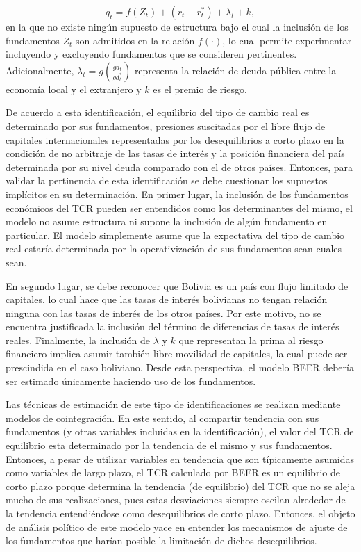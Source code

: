 \documentclass[12pt,letterpaper]{article}
\begin{document}
\begin{equation}\label{qb}
q_t=f(Z_t)+(r_t-r_t^*)+\lambda_t+k,
\end{equation}
en la que no existe ningún supuesto de estructura bajo el cual la inclusión de los fundamentos $Z_t$ son admitidos en la relación $f(\cdot)$, lo cual permite experimentar incluyendo y excluyendo fundamentos que se consideren pertinentes. Adicionalmente, $\lambda_t=g(\frac{gd_t}{gd_t^*})$ representa la relación de deuda pública entre la economía local y el extranjero y $k$ es el premio de riesgo. 

De acuerdo a esta identificación, el equilibrio del tipo de cambio real es determinado por sus fundamentos, presiones suscitadas por el libre flujo de capitales internacionales representadas por los desequilibrios a corto plazo en la condición de no arbitraje de las tasas de interés y la posición financiera del país determinada por su nivel deuda comparado con el de otros países. Entonces, para validar la pertinencia de esta identificación se debe cuestionar los supuestos implícitos en su determinación. En primer lugar, la inclusión de los fundamentos económicos del TCR pueden ser entendidos como los determinantes del mismo, el modelo no asume estructura ni supone la inclusión de algún fundamento en particular. El modelo simplemente asume que la expectativa del tipo de cambio real estaría determinada por la operativización de sus fundamentos sean cuales sean. 

En segundo lugar, se debe reconocer que Bolivia es un país con flujo limitado de capitales, lo cual hace que las tasas de interés bolivianas no tengan relación ninguna con las tasas de interés de los otros países. Por este motivo, no se encuentra justificada la inclusión del término de diferencias de tasas de interés reales. Finalmente, la inclusión de $\lambda$ y $k$ que representan la prima al riesgo financiero implica asumir también libre movilidad de capitales, la cual puede ser prescindida en el caso boliviano. Desde esta perspectiva, el modelo BEER debería ser estimado únicamente haciendo uso de los fundamentos. 

Las técnicas de estimación de este tipo de identificaciones se realizan mediante modelos de cointegración. En este sentido, al compartir tendencia con sus fundamentos (y otras variables incluidas en la identificación), el valor del TCR  de equilibrio esta determinado por la tendencia de el mismo y sus fundamentos. Entonces, a pesar de utilizar variables en tendencia que son típicamente asumidas como variables de largo plazo, el TCR calculado por BEER es un equilibrio de corto plazo porque determina la tendencia (de equilibrio) del TCR que no se aleja mucho de sus realizaciones, pues estas desviaciones siempre oscilan alrededor de la tendencia entendiéndose como desequilibrios de corto plazo. Entonces, el objeto de análisis político de este modelo yace en entender los mecanismos de ajuste de los fundamentos que harían posible la limitación de dichos desequilibrios.
\end{document}
